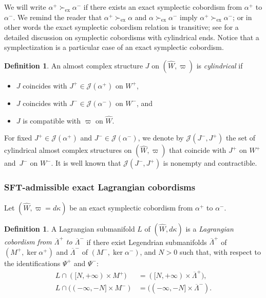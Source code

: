 \documentclass[JEP,XML,SOM,Unicode,NoFloatCountersInSection]{cedram}
\let\mathcal\mathscr
\newcommand{\exact}{\mathrm{ex}}
\theoremstyle{plain}
\theoremstyle{definition}
\newtheorem{defn}[thm]{Definition}
\numberwithin{equation}{subsection}
\begin{document}
We will write $ \alpha^+ \succ_{\exact} \alpha^-$ if there exists an exact symplectic cobordism from $ \alpha^+$ to $ \alpha^-$. We remind the reader that $\alpha^+ \succ_{\exact} \alpha$ and $ \alpha \succ_{\exact} \alpha^-$ imply $ \alpha^+ \succ_{\exact} \alpha^-$; or in other words the exact symplectic cobordism relation is transitive; see \cite{CPT} for a detailed discussion on symplectic cobordisms with cylindrical ends. Notice that a symplectization is a particular case of an exact symplectic cobordism.

\begin{defn}
An almost complex structure $J$ on $(\widehat{W},\varpi)$ is {\em cylindrical} if
\begin{itemize}
\item $J$ coincides with $J^+ \in \mathcal{J}(\alpha^+)$ on $W^+$,
\item $J$ coincides with $J^- \in \mathcal{J}(\alpha^-)$ on $W^-$, and
\item $J$ is compatible with $\varpi$ on $\widehat{W}$.
\end{itemize}
\end{defn}

For fixed $J^+ \in \mathcal{J}(\alpha^+)$ and $J^- \in \mathcal{J}(\alpha^-)$, we denote by $\mathcal{J}(J^-,J^+)$ the set of cylindrical almost complex structures on $(\widehat{W},\varpi)$ that coincide with $J^+$ on $W^+$ and~$J^-$ on $W^-$. It is well known that $\mathcal{J}(J^-,J^+)$ is nonempty and contractible.

\subsubsection{SFT-admissible exact Lagrangian cobordisms}

Let $(\widehat W,\varpi=d\kappa)$ be an exact symplectic cobordism from $\alpha^+$ to $\alpha^-$.

\begin{defn}
A Lagrangian submanifold $L$ of $(\widehat W,d\kappa)$ is a {\em Lagrangian cobordism from $\overline{\Lambda}^+$ to $\overline{\Lambda}^-$} if there exist Legendrian submanifolds $\overline{\Lambda}^+$ of $(M^+,\ker \alpha^+)$ and $\overline{\Lambda}^-$ of $(M^-,\ker \alpha^-)$, and $N>0$ such that, with respect to the identifications $\Psi^+$ and $\Psi^-$:
\begin{align}
L \cap ([N,+\infty) \times M^+) &= ([N,+\infty) \times \overline{\Lambda}^+), \\
L \cap ((-\infty,-N] \times M^-)&= ((-\infty,-N] \times \overline{\Lambda}^-).
\end{align}
\end{defn}
\end{document}
